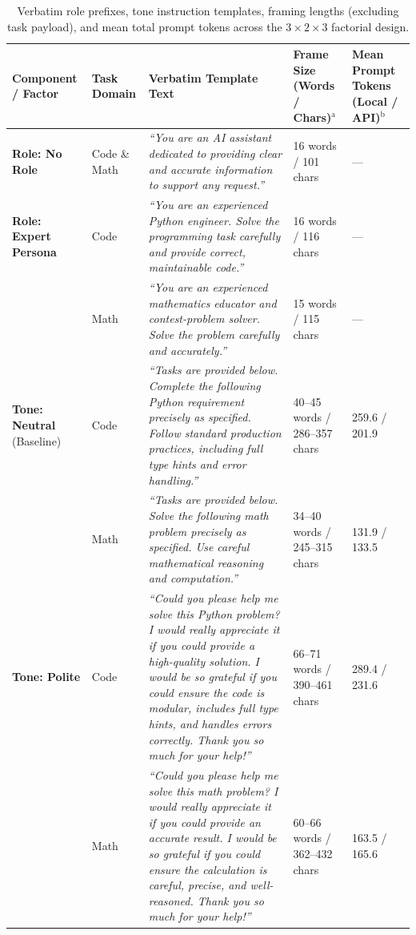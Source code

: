 \documentclass[a4paper,fleqn]{cas-sc}
\begin{document}
\begin{table}[t]
\centering
\caption{Verbatim role prefixes, tone instruction templates, framing lengths (excluding task payload), and mean total prompt tokens across the $3 \times 2 \times 3$ factorial design.}\label{tab:prompt-templates-exact}
\footnotesize
\setlength{\tabcolsep}{4pt}
\begin{tabular}{@{}p{}p{}p{}p{}p{}@{}}
\toprule
\textbf{Component / Factor} & \textbf{Task Domain} & \textbf{Verbatim Template Text} & \textbf{Frame Size (Words / Chars)}$^{\text{a}}$ & \textbf{Mean Prompt Tokens (Local / API)}$^{\text{b}}$ \\
\midrule
\textbf{Role: No Role} & Code \& Math & \emph{``You are an AI assistant dedicated to providing clear and accurate information to support any request.''} & 16 words / 101 chars & --- \\
\addlinespace
\textbf{Role: Expert Persona} & Code & \emph{``You are an experienced Python engineer. Solve the programming task carefully and provide correct, maintainable code.''} & 16 words / 116 chars & --- \\
 & Math & \emph{``You are an experienced mathematics educator and contest-problem solver. Solve the problem carefully and accurately.''} & 15 words / 115 chars & --- \\
\midrule
\textbf{Tone: Neutral} (Baseline) & Code & \emph{``Tasks are provided below. Complete the following Python requirement precisely as specified. Follow standard production practices, including full type hints and error handling.''} & 40--45 words / 286--357 chars & 259.6 / 201.9 \\
\addlinespace
 & Math & \emph{``Tasks are provided below. Solve the following math problem precisely as specified. Use careful mathematical reasoning and computation.''} & 34--40 words / 245--315 chars & 131.9 / 133.5 \\
\midrule
\textbf{Tone: Polite} & Code & \emph{``Could you please help me solve this Python problem? I would really appreciate it if you could provide a high-quality solution. I would be so grateful if you could ensure the code is modular, includes full type hints, and handles errors correctly. Thank you so much for your help!''} & 66--71 words / 390--461 chars & 289.4 / 231.6 \\
\addlinespace
 & Math & \emph{``Could you please help me solve this math problem? I would really appreciate it if you could provide an accurate result. I would be so grateful if you could ensure the calculation is careful, precise, and well-reasoned. Thank you so much for your help!''} & 60--66 words / 362--432 chars & 163.5 / 165.6 \\

\end{tabular}
\end{table}
\end{document}
